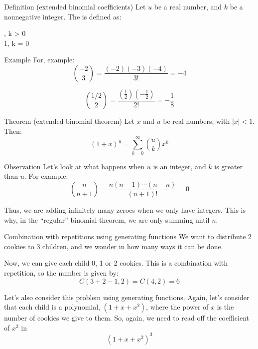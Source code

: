\documentclass[a4paper]{article}
\begin{document}
\begin{parag}{Definition (extended binomial coefficients)}
    Let $u$ be a real number, and $k$ be a nonnegative integer. The  is defined as:
    \begin{functionbypart}{}
        , \mathspace {} k > 0 \\
        1, \mathspace {} k = 0
    \end{functionbypart}

    \begin{subparag}{Example}
        For, example:
        \[\binom{-2}{3} = \frac{\left(-2\right)\left(-3\right)\left(-4\right)}{3!} = -4\]

        \[\binom{1 / 2}{2} = \frac{\left(\frac{1}{2}\right)\left(- \frac{1}{2}\right)}{2!} = -\frac{1}{8}\]
    \end{subparag}
\end{parag}

\begin{parag}{Theorem (extended binomial theorem)}
    Let $x$ and $u$ be real numbers, with $\left|x\right| < 1$. Then:
    \[\left(1 + x\right)^u = \sum_{k=0}^{\infty} \binom{u}{k} x^k\]

    \begin{subparag}{Observation}
        Let's look at what happens when $u$ is an integer, and $k$ is greater than $u$. For example:
        \[\binom{n}{n+1} = \frac{n\left(n-1\right) \cdots \left(n-n\right)}{\left(n+1\right)!} = 0\]

        Thus, we are adding infinitely many zeroes when we only have integers. This is why, in the ``regular'' binomial theorem, we are only summing until $n$.
    \end{subparag}
\end{parag}

\begin{parag}{Combination with repetitions using generating functions}
    We want to distribute 2 cookies to 3 children, and we wonder in how many ways it can be done.

    Now, we can give each child 0, 1 or 2 cookies. This is a combination with repetition, so the number is given by:
    \[C\left(3 + 2 - 1, 2\right) = C\left(4, 2\right) = 6\]

    Let's also consider this problem using generating functions. Again, let's consider that each child is a polynomial, $\left(1 + x + x^2\right)$, where the power of $x$ is the number of cookies we give to them. So, again, we need to read off the coefficient of $x^2$ in
    \[\left(1 + x + x^2\right)^3\]
\end{parag}
\end{document}
